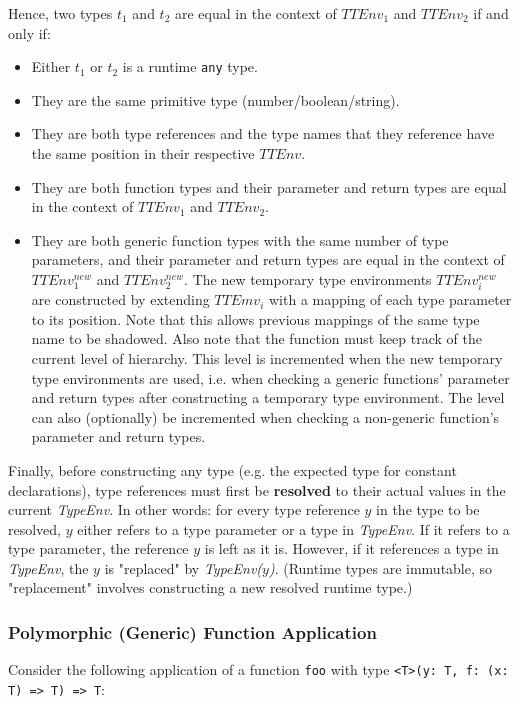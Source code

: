 Hence, two types $t_1$ and $t_2$ are equal in the context of $TTEnv_1$ and $TTEnv_2$ if and only if:
\begin{itemize}
    \item Either $t_1$ or $t_2$ is a runtime \verb|any| type.
    \item They are the same primitive type (number/boolean/string).
    \item They are both type references and the type names that they reference have the same position in their respective $TTEnv$.
    \item They are both function types and their parameter and return types are equal in the context of $TTEnv_1$ and $TTEnv_2$.
    \item They are both generic function types with the same number of type parameters, and their parameter and return types are equal in the context of $TTEnv_1^{new}$ and $TTEnv_2^{new}$. 
    The new temporary type environments $TTEnv_i^{new}$ are constructed by extending $TTEmv_i$ with a mapping of each type parameter to its position. Note that this allows previous mappings of the same type name to be shadowed.
    Also note that the function must keep track of the current level of hierarchy. This level is incremented when the new temporary type environments are used, i.e. when checking a generic functions' parameter and return types after constructing a temporary type environment. The level can also (optionally) be incremented when checking a non-generic function's parameter and return types.
\end{itemize}

Finally, before constructing any type (e.g. the expected type for constant declarations), type references must first be \textbf{resolved} to their actual values in the current \textit{TypeEnv}. 
In other words: for every type reference $y$ in the type to be resolved, $y$ either refers to a type parameter or a type in \textit{TypeEnv}. If it refers to a type parameter, the reference $y$ is left as it is. However, if it references a type in \textit{TypeEnv}, the $y$ is "replaced" by \textit{TypeEnv($y$)}. 
(Runtime types are immutable, so "replacement" involves constructing a new resolved runtime type.)


\subsubsection*{Polymorphic (Generic) Function Application}

Consider the following application of a function \verb|foo| with type 
\verb|<T>(y: T, f: (x: T) => T) => T|:

